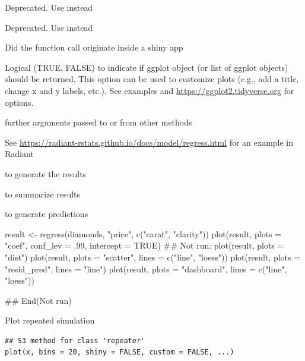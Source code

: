 \documentclass[a4paper]{book}
\begin{document}
\begin{Arguments}
\begin{ldescription}
\item[\code{minq}] Deprecated. Use  instead

\item[\code{maxq}] Deprecated. Use  instead

\item[\code{shiny}] Did the function call originate inside a shiny app

\item[\code{custom}] Logical (TRUE, FALSE) to indicate if ggplot object (or list of ggplot objects) should be returned. This option can be used to customize plots (e.g., add a title, change x and y labels, etc.). See examples and \url{https://ggplot2.tidyverse.org} for options.

\item[\code{...}] further arguments passed to or from other methods
\end{ldescription}
\end{Arguments}
%
\begin{Details}
See \url{https://radiant-rstats.github.io/docs/model/regress.html} for an example in Radiant
\end{Details}
%
\begin{SeeAlso}
 to generate the results

 to summarize results

 to generate predictions
\end{SeeAlso}
%
\begin{Examples}
\begin{ExampleCode}
result <- regress(diamonds, "price", c("carat", "clarity"))
plot(result, plots = "coef", conf_lev = .99, intercept = TRUE)
## Not run: 
plot(result, plots = "dist")
plot(result, plots = "scatter", lines = c("line", "loess"))
plot(result, plots = "resid_pred", lines = "line")
plot(result, plots = "dashboard", lines = c("line", "loess"))

## End(Not run)
\end{ExampleCode}
\end{Examples}
%
\begin{Description}
Plot repeated simulation
\end{Description}
%
\begin{Usage}
\begin{verbatim}
## S3 method for class 'repeater'
plot(x, bins = 20, shiny = FALSE, custom = FALSE, ...)
\end{verbatim}
\end{Usage}
\end{document}
